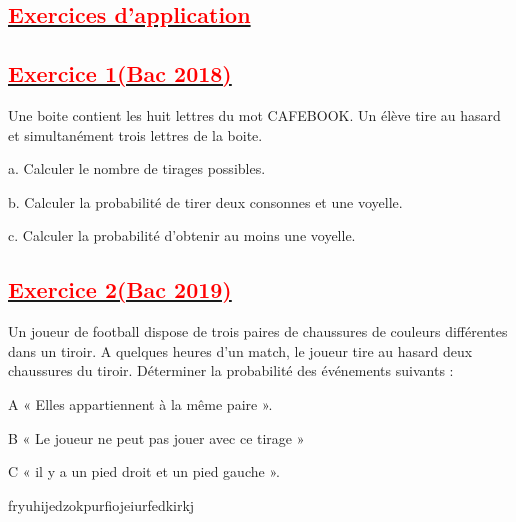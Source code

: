 \documentclass[12pt]{article}
\begin{document}
\subsection*{\underline{\textbf{\textcolor{red}{Exercices d’application}}}}
\subsection*{\underline{\textbf{\textcolor{red}{Exercice 1(Bac 2018)}}}}
Une boite contient les huit lettres du mot CAFEBOOK. Un élève tire au hasard et simultanément 
trois lettres de la boite.

a. Calculer le nombre de tirages possibles.

b. Calculer la probabilité de tirer deux consonnes et une voyelle.

c. Calculer la probabilité d’obtenir au moins une voyelle.
\subsection*{\underline{\textbf{\textcolor{red}{Exercice 2(Bac 2019)}}}}
Un joueur de football dispose de trois paires de chaussures de couleurs différentes dans un tiroir. 
A quelques heures d’un match, le joueur tire au hasard deux chaussures du tiroir. Déterminer la 
probabilité des événements suivants :

A «  Elles appartiennent à la même paire ».

B «  Le joueur ne peut pas jouer avec ce tirage »

C «  il y a un pied droit et un pied gauche ».

fryuhijedzokpurfiojeiurfedkirkj
\end{document}

